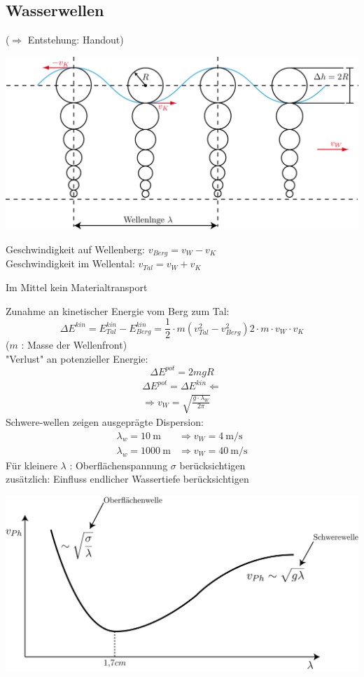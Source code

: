 \subsection{Wasserwellen}
\enter
($ \Rightarrow $ Entstehung: Handout)
\begin{center}
	\includegraphics[width=0.7\linewidth]{skizzen/19/19B26}
\end{center}
Geschwindigkeit auf Wellenberg: $ v_{Berg} = v_W - v_K$\\
Geschwindigkeit im Wellental: $ v_{Tal} = v_{W} + v_{K} $\\
\begin{tcolorbox}[width=\textwidth*3/5,colback={White}]
Im Mittel kein Materialtransport
\end{tcolorbox}
Zunahme an kinetischer Energie vom Berg zum Tal:
$$ \Delta E^{kin} = E_{Tal}^{kin} - E_{Berg}^{kin} = \frac{1}{2} \cdot m (v_{Tal}^2 - v_{Berg}^2) 2 \cdot m \cdot v_{W} \cdot v_{K}$$
($ m $ : Masse der Wellenfront)\\
"Verlust" an potenzieller Energie:
$$ \Delta E ^{pot} = 2mgR $$
\begin{align*}
\Delta E^{pot}  = \Delta E ^{kin} \Leftarrow\\
\Rightarrow v_W = \sqrt{\frac{g\cdot\lambda_W}{2\pi}}
\end{align*}
Schwere-wellen zeigen ausgeprägte Dispersion:
\begin{align*}
\lambda_w = \SI{10}{\meter} &\Rightarrow v_W = \SI{4}{\meter\per\second}\\
\lambda_w = \SI{1000}{\meter} &\Rightarrow v_W = \SI{40}{\meter\per\second}
\end{align*}
Für kleinere $ \lambda $ : Oberflächenspannung $ \sigma $ berücksichtigen\\
zusätzlich: Einfluss endlicher Wassertiefe berücksichtigen
\begin{center}
	\includegraphics[width=0.7\linewidth]{skizzen/19/19B27}
\end{center}
